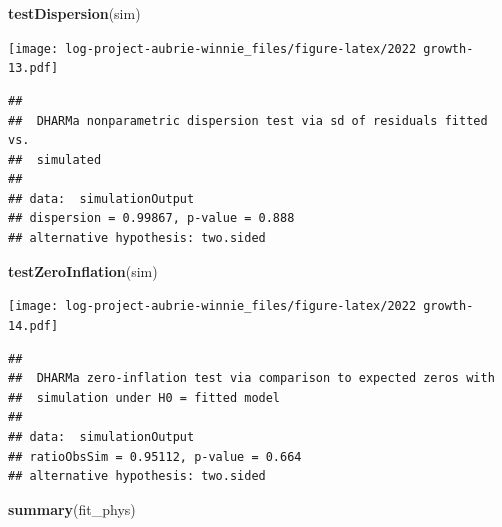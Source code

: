 \documentclass[
]{article}
\newenvironment{Shaded}{\begin{snugshade}}{\end{snugshade}}
\newcommand{\FunctionTok}[1]{\textcolor[rgb]{0.13,0.29,0.53}{\textbf{#1}}}
\newcommand{\NormalTok}[1]{#1}
\begin{document}
\begin{Shaded}
\begin{Highlighting}[]
\FunctionTok{testDispersion}\NormalTok{(sim) }
\end{Highlighting}
\end{Shaded}

\texttt{[image: log-project-aubrie-winnie\_files/figure-latex/2022 growth-13.pdf]}

\begin{verbatim}
## 
##  DHARMa nonparametric dispersion test via sd of residuals fitted vs.
##  simulated
## 
## data:  simulationOutput
## dispersion = 0.99867, p-value = 0.888
## alternative hypothesis: two.sided
\end{verbatim}

\begin{Shaded}
\begin{Highlighting}[]
\FunctionTok{testZeroInflation}\NormalTok{(sim)}
\end{Highlighting}
\end{Shaded}

\texttt{[image: log-project-aubrie-winnie\_files/figure-latex/2022 growth-14.pdf]}

\begin{verbatim}
## 
##  DHARMa zero-inflation test via comparison to expected zeros with
##  simulation under H0 = fitted model
## 
## data:  simulationOutput
## ratioObsSim = 0.95112, p-value = 0.664
## alternative hypothesis: two.sided
\end{verbatim}

\begin{Shaded}
\begin{Highlighting}[]
\FunctionTok{summary}\NormalTok{(fit\_phys)}
\end{Highlighting}
\end{Shaded}
\end{document}
